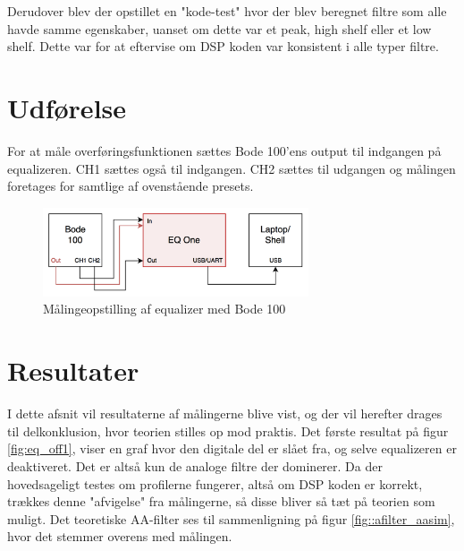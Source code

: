 Derudover blev der opstillet en "kode-test" hvor der blev beregnet filtre som alle havde samme egenskaber, uanset om dette var et peak, high shelf eller et low shelf. Dette var for at eftervise om DSP koden var konsistent i alle typer filtre. \\

\section{Udførelse}
For at måle overføringsfunktionen sættes Bode 100'ens output til indgangen på equalizeren. CH1 sættes også til indgangen. CH2 sættes til udgangen og målingen foretages for samtlige af ovenstående presets. \\


\begin{figure}[h!]\label{fig:bode_setup}
	\centering
	\includegraphics[width=0.7\textwidth]{billeder/bode_setup}
	\caption{Målingeopstilling af equalizer med Bode 100}
\end{figure}	

\FloatBlock

\section{Resultater}
I dette afsnit vil resultaterne af målingerne blive vist, og der vil herefter drages til delkonklusion, hvor teorien stilles op mod praktis.
Det første resultat på figur \ref{fig:eq_off1}, viser en graf hvor den digitale del er slået fra, og selve equalizeren er deaktiveret. Det er altså kun de analoge filtre der dominerer. Da der hovedsageligt testes om profilerne fungerer, altså om DSP koden er korrekt, trækkes denne "afvigelse" fra målingerne, så disse bliver så tæt på teorien som muligt. Det teoretiske AA-filter ses til sammenligning på figur \ref{fig::afilter_aasim}, hvor det stemmer overens med målingen. \\ 

